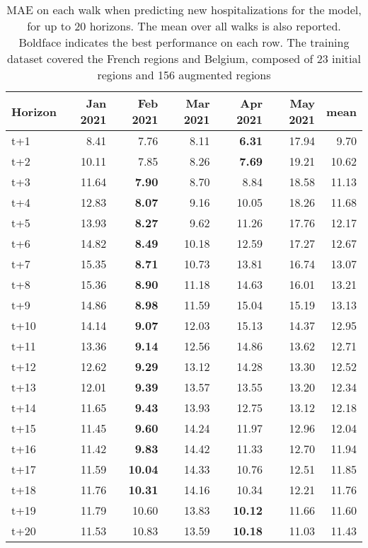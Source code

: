 \begin{table}[H]
\centering
\caption{MAE on each walk when predicting new hospitalizations for the model, for up to 20 horizons. The mean over all walks is also reported. Boldface indicates the best performance on each row. The training dataset covered the French regions and Belgium, composed of 23 initial regions and 156 augmented regions }
\label{tab:MAE_walk_encoder_decoder}
\begin{tabular}{lrrrrrr}
\toprule
Horizon &  Jan 2021 &  Feb 2021 &  Mar 2021 &  Apr 2021 &  May 2021 &  mean \\
\midrule
t+1  & 8.41  & 7.76  & 8.11  & \textbf{6.31}  & 17.94  & 9.70  \\
t+2  & 10.11  & 7.85  & 8.26  & \textbf{7.69}  & 19.21  & 10.62  \\
t+3  & 11.64  & \textbf{7.90}  & 8.70  & 8.84  & 18.58  & 11.13  \\
t+4  & 12.83  & \textbf{8.07}  & 9.16  & 10.05  & 18.26  & 11.68  \\
t+5  & 13.93  & \textbf{8.27}  & 9.62  & 11.26  & 17.76  & 12.17  \\
t+6  & 14.82  & \textbf{8.49}  & 10.18  & 12.59  & 17.27  & 12.67  \\
t+7  & 15.35  & \textbf{8.71}  & 10.73  & 13.81  & 16.74  & 13.07  \\
t+8  & 15.36  & \textbf{8.90}  & 11.18  & 14.63  & 16.01  & 13.21  \\
t+9  & 14.86  & \textbf{8.98}  & 11.59  & 15.04  & 15.19  & 13.13  \\
t+10  & 14.14  & \textbf{9.07}  & 12.03  & 15.13  & 14.37  & 12.95  \\
t+11  & 13.36  & \textbf{9.14}  & 12.56  & 14.86  & 13.62  & 12.71  \\
t+12  & 12.62  & \textbf{9.29}  & 13.12  & 14.28  & 13.30  & 12.52  \\
t+13  & 12.01  & \textbf{9.39}  & 13.57  & 13.55  & 13.20  & 12.34  \\
t+14  & 11.65  & \textbf{9.43}  & 13.93  & 12.75  & 13.12  & 12.18  \\
t+15  & 11.45  & \textbf{9.60}  & 14.24  & 11.97  & 12.96  & 12.04  \\
t+16  & 11.42  & \textbf{9.83}  & 14.42  & 11.33  & 12.70  & 11.94  \\
t+17  & 11.59  & \textbf{10.04}  & 14.33  & 10.76  & 12.51  & 11.85  \\
t+18  & 11.76  & \textbf{10.31}  & 14.16  & 10.34  & 12.21  & 11.76  \\
t+19  & 11.79  & 10.60  & 13.83  & \textbf{10.12}  & 11.66  & 11.60  \\
t+20  & 11.53  & 10.83  & 13.59  & \textbf{10.18}  & 11.03  & 11.43  \\

\bottomrule
\end{tabular}
\end{table}
